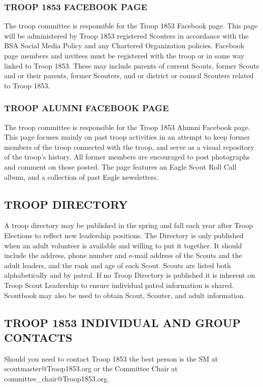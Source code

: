 \documentclass{ltxguide}
\begin{document}
\subsubsection{TROOP 1853 FACEBOOK PAGE}
The troop committee is responsible for the Troop 1853 Facebook page. This page will be administered by Troop 1853 registered Scouters in accordance with the \ac{BSA} Social Media Policy and any Chartered Organization policies. Facebook page members and invitees must be registered with the troop or in some way linked to Troop 1853. These may include parents of current Scouts, former Scouts and or their parents, former Scouters, and or district or council Scouters related to Troop 1853.

\subsubsection{TROOP ALUMNI FACEBOOK PAGE}
The troop committee is responsible for the Troop 1853 Alumni Facebook page. This page focuses mainly on past troop activities in an attempt to keep former members of the troop connected with the troop, and serve as a visual repository of the troop's history. All former members are encouraged to post photographs and comment on those posted. The page features an Eagle Scout Roll Call album, and a collection of past Eagle newsletters.

\subsection{TROOP DIRECTORY}
A troop directory may be published in the spring and fall each year after Troop Elections to reflect new leadership positions. The Directory is only published when an adult volunteer is available and willing to put it together. It should include the address, phone number and e-mail address of the Scouts and the adult leaders, and the rank and age of each Scout. Scouts are listed both alphabetically and by patrol. If no Troop Directory is published it is inherent on Troop Scout Leadership to ensure individual patrol information is shared. Scoutbook may also be used to obtain Scout, Scouter, and adult information.

\subsection{TROOP 1853 INDIVIDUAL AND GROUP CONTACTS}
Should you need to contact Troop 1853 the best person is the \ac{SM} at 
scoutmaster@Troop1853.org 
or the Committee Chair at 
committee\_chair@Troop1853.org.
\end{document}
